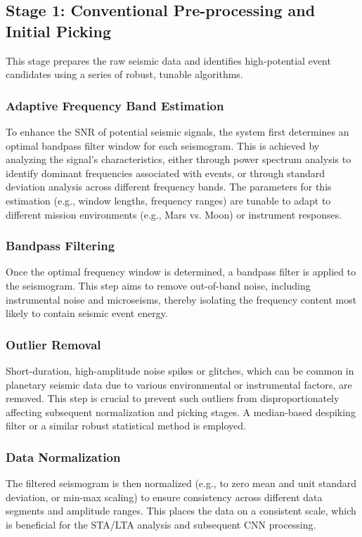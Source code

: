 \documentclass[11pt,a4paper]{article}
\begin{document}
\subsection{Stage 1: Conventional Pre-processing and Initial Picking}
This stage prepares the raw seismic data and identifies high-potential event candidates using a series of robust, tunable algorithms.

\subsubsection{Adaptive Frequency Band Estimation}
To enhance the SNR of potential seismic signals, the system first determines an optimal bandpass filter window for each seismogram. This is achieved by analyzing the signal's characteristics, either through power spectrum analysis to identify dominant frequencies associated with events, or through standard deviation analysis across different frequency bands. The parameters for this estimation (e.g., window lengths, frequency ranges) are tunable to adapt to different mission environments (e.g., Mars vs. Moon) or instrument responses.

\subsubsection{Bandpass Filtering}
Once the optimal frequency window is determined, a bandpass filter is applied to the seismogram. This step aims to remove out-of-band noise, including instrumental noise and microseisms, thereby isolating the frequency content most likely to contain seismic event energy.

\subsubsection{Outlier Removal}
Short-duration, high-amplitude noise spikes or glitches, which can be common in planetary seismic data due to various environmental or instrumental factors, are removed. This step is crucial to prevent such outliers from disproportionately affecting subsequent normalization and picking stages. A median-based despiking filter or a similar robust statistical method is employed.

\subsubsection{Data Normalization}
The filtered seismogram is then normalized (e.g., to zero mean and unit standard deviation, or min-max scaling) to ensure consistency across different data segments and amplitude ranges. This places the data on a consistent scale, which is beneficial for the STA/LTA analysis and subsequent CNN processing.
\end{document}
